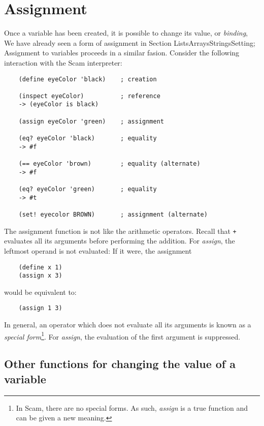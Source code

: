 \chapter{Assignment}
\label{Assignment}

Once a variable has been created, it is possible to change its value,
or {\it binding},
We have already seen a form of assignment in
Section {\link ListsArraysStringsSetting};
Assignment to variables proceeds in a similar fasion.
Consider the following interaction with
the Scam interpreter:

\begin{verbatim}
    (define eyeColor 'black)    ; creation
    
    (inspect eyeColor)          ; reference
    -> (eyeColor is black)
    
    (assign eyeColor 'green)    ; assignment
    
    (eq? eyeColor 'black)       ; equality
    -> #f
    
    (== eyeColor 'brown)        ; equality (alternate)
    -> #f

    (eq? eyeColor 'green)       ; equality
    -> #t

    (set! eyecolor BROWN)       ; assignment (alternate)
\end{verbatim}

The assignment function is not like the arithmetic operators.
Recall that {\tt +} evaluates all its arguments
before performing the addition.
For {\it assign},
the leftmost operand is not evaluated:
If it were, the assignment

\begin{verbatim}
    (define x 1)
    (assign x 3)
\end{verbatim}
    
would be equivalent to:

\begin{verbatim}
    (assign 1 3)
\end{verbatim}

In general, an operator which does not evaluate
all its arguments is known as a {\it special form}\footnote{
In Scam, there are no special forms. As such, {\it assign} is
a true function and can be given a new meaning.}.
For {\it assign}, the evaluation of the first argument
is suppressed.

\section{Other functions for changing the value of a variable}

